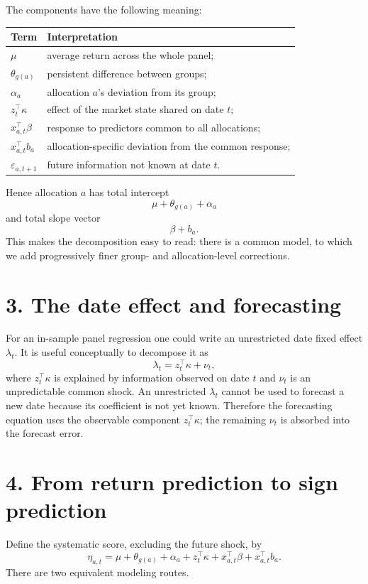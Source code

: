 \documentclass[10pt,a4paper]{article}
\begin{document}
The components have the following meaning:
\begin{center}
\begin{tabular}{@{}ll@{}}
\toprule
Term & Interpretation \\
\midrule
$\mu$ & average return across the whole panel; \\
$\theta_{g(a)}$ & persistent difference between groups; \\
$\alpha_a$ & allocation $a$'s deviation from its group; \\
$z_t^\top\kappa$ & effect of the market state shared on date $t$; \\
$x_{a,t}^\top\beta$ & response to predictors common to all allocations; \\
$x_{a,t}^\top b_a$ & allocation-specific deviation from the common response; \\
$\varepsilon_{a,t+1}$ & future information not known at date $t$. \\
\bottomrule
\end{tabular}
\end{center}

Hence allocation $a$ has total intercept
\[
  \mu+\theta_{g(a)}+\alpha_a
\]
and total slope vector
\[
  \beta+b_a.
\]
This makes the decomposition easy to read: there is a common model, to which
we add progressively finer group- and allocation-level corrections.

\section*{3. The date effect and forecasting}

For an in-sample panel regression one could write an unrestricted date fixed
effect $\lambda_t$. It is useful conceptually to decompose it as
\[
  \lambda_t=z_t^\top\kappa+\nu_t,
\]
where $z_t^\top\kappa$ is explained by information observed on date $t$ and
$\nu_t$ is an unpredictable common shock. An unrestricted $\lambda_t$ cannot
be used to forecast a new date because its coefficient is not yet known.
Therefore the forecasting equation uses the observable component
$z_t^\top\kappa$; the remaining $\nu_t$ is absorbed into the forecast error.

\section*{4. From return prediction to sign prediction}

Define the systematic score, excluding the future shock, by
\[
  \eta_{a,t}
  =\mu+\theta_{g(a)}+\alpha_a+z_t^\top\kappa
   +x_{a,t}^\top\beta+x_{a,t}^\top b_a.
\]
There are two equivalent modeling routes.
\end{document}
